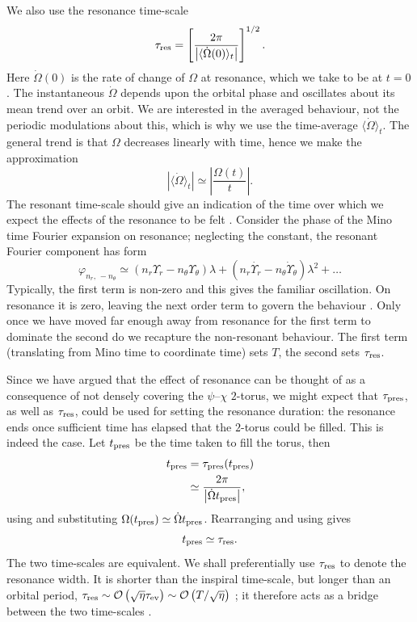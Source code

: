We also use the resonance time-scale
\begin{equation}
\tau_\mathrm{res} = \left[\dfrac{2\pi}{\left|\langle\dot{\Omega}(0)\rangle_t\right|}\right]^{1/2}.
\label{eq:t-res}
\end{equation}
Here $\dot{\Omega}(0)$ is the rate of change of $\Omega$ at resonance, which we take to be at $t = 0$. The instantaneous $\dot{\Omega}$ depends upon the orbital phase and oscillates about its mean trend over an orbit. We are interested in the averaged behaviour, not the periodic modulations about this, which is why we use the time-average $\langle\dot{\Omega}\rangle_t$. The general trend is that $\Omega$ decreases linearly with time, hence we make the approximation
\begin{equation}
\left|\langle\dot{\Omega}\rangle_t\right| \simeq \left|\dfrac{\Omega(t)}{t}\right|.
\end{equation}
The resonant time-scale should give an indication of the time over which we expect the effects of the resonance to be felt \citep{Bosley1992}. Consider the phase of the Mino time Fourier expansion on resonance; neglecting the constant, the resonant Fourier component has form
\begin{equation}
\varphi_{n_r,\,-n_\theta} \simeq \left(n_r\Upsilon_r - n_\theta\Upsilon_\theta\right)\lambda + \left(n_r\dot{\Upsilon_r} - n_\theta\dot{\Upsilon}_\theta\right)\lambda^2 + \ldots
\end{equation}
Typically, the first term is non-zero and this gives the familiar oscillation. On resonance it is zero, leaving the next order term to govern the behaviour \citep{Flanagan2012}. Only once we have moved far enough away from resonance for the first term to dominate the second do we recapture the non-resonant behaviour. The first term (translating from Mino time to coordinate time) sets $T$, the second sets $\tau_\mathrm{res}$.

Since we have argued that the effect of resonance can be thought of as a consequence of not densely covering the $\psi$--$\chi$ $2$-torus, we might expect that $\tau_\mathrm{pres}$, as well as $\tau_\mathrm{res}$, could be used for setting the resonance duration: the resonance ends once sufficient time has elapsed that the $2$-torus could be filled. This is indeed the case. Let $t_\mathrm{pres}$ be the time taken to fill the torus, then
\begin{align}
t_\mathrm{pres} = {} & \tau_\mathrm{pres}(t_\mathrm{pres}) \\
 \simeq {} & \dfrac{2\pi}{\left|\dot{\Omega}t_\mathrm{pres}\right|}, \nonumber 
\end{align}
using  and substituting $\Omega(t_\mathrm{pres}) \simeq \dot{\Omega}t_\mathrm{pres}$. Rearranging and using  gives
\begin{equation}
t_\mathrm{pres} \simeq \tau_\mathrm{res}.
\end{equation}
The two time-scales are equivalent. We shall preferentially use $\tau_\mathrm{res}$ to denote the resonance width. It is shorter than the inspiral time-scale, but longer than an orbital period, $\tau_\mathrm{res} \sim \mathcal{O}\left({\sqrt{\eta}\tau_\mathrm{ev}}\right) \sim \mathcal{O}\left({T/\sqrt{\eta}}\right)$ \citep{Flanagan2012,Gair2011a}; it therefore acts as a bridge between the two time-scales \citep{Hinderer2008}.

